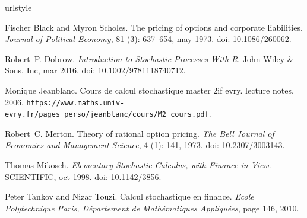 \begin{thebibliography}{2}
\providecommand{\natexlab}[1]{#1}
\providecommand{\url}[1]{\texttt{#1}}
\expandafter\ifx\csname urlstyle\endcsname\relax
  \providecommand{\doi}[1]{doi: #1}\else
  \providecommand{\doi}{doi: \begingroup \urlstyle{rm}\Url}\fi

Fischer Black and Myron Scholes.
\newblock The pricing of options and corporate liabilities.
\newblock \emph{Journal of Political Economy}, 81 (3):
  637--654, may 1973.
\newblock \doi{10.1086/260062}.

Robert~P. Dobrow.
\newblock \emph{Introduction to Stochastic Processes With R}.
\newblock John Wiley {\&} Sons, Inc, mar 2016.
\newblock \doi{10.1002/9781118740712}.

Monique Jeanblanc.
\newblock Cours de calcul stochastique master 2if evry.
\newblock lecture notes, 2006.
\newblock
  \url{https://www.maths.univ-evry.fr/pages_perso/jeanblanc/cours/M2_cours.pdf}.

Robert~C. Merton.
\newblock Theory of rational option pricing.
\newblock \emph{The Bell Journal of Economics and Management Science},
  4 (1): 141, 1973.
\newblock \doi{10.2307/3003143}.

Thomas Mikosch.
\newblock \emph{Elementary Stochastic Calculus, with Finance in View}.
 {SCIENTIFIC}, oct 1998.
\newblock \doi{10.1142/3856}.



Peter Tankov and Nizar Touzi.
\newblock Calcul stochastique en finance.
\newblock \emph{Ecole Polytechnique Paris, D{\'e}partement de Math{\'e}matiques
  Appliqu{\'e}es}, page 146, 2010.

\end{thebibliography}
